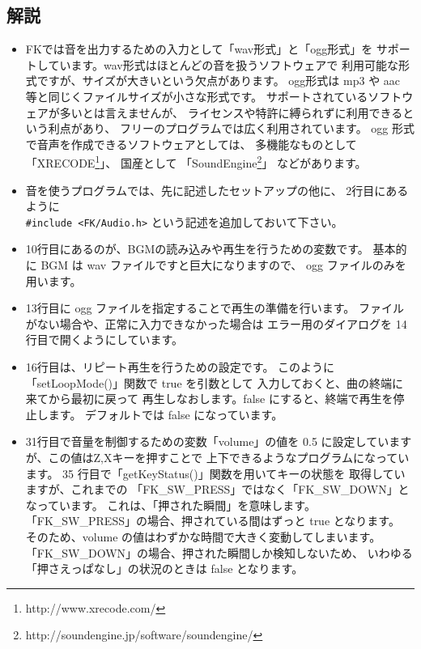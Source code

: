 \subsection*{解説}
\begin{itemize}
 \item FKでは音を出力するための入力として「wav形式」と「ogg形式」を
	サポートしています。wav形式はほとんどの音を扱うソフトウェアで
	利用可能な形式ですが、サイズが大きいという欠点があります。
	ogg形式は mp3 や aac 等と同じくファイルサイズが小さな形式です。
	サポートされているソフトウェアが多いとは言えませんが、
	ライセンスや特許に縛られずに利用できるという利点があり、
	フリーのプログラムでは広く利用されています。
	ogg 形式で音声を作成できるソフトウェアとしては、
	多機能なものとして
	「XRECODE\footnote{http://www.xrecode.com/}」、
	国産として
	「SoundEngine\footnote{
	http://soundengine.jp/software/soundengine/}」
	などがあります。

 \item 音を使うプログラムでは、先に記述したセットアップの他に、
	2行目にあるように\\
	\verb+#include <FK/Audio.h>+
	という記述を追加しておいて下さい。

 \item 10行目にあるのが、BGMの読み込みや再生を行うための変数です。
	基本的に BGM は wav ファイルですと巨大になりますので、
	ogg ファイルのみを用います。

 \item 13行目に ogg ファイルを指定することで再生の準備を行います。
	ファイルがない場合や、正常に入力できなかった場合は
	エラー用のダイアログを 14 行目で開くようにしています。

 \item 16行目は、リピート再生を行うための設定です。
	このように「setLoopMode()」関数で true を引数として
	入力しておくと、曲の終端に来てから最初に戻って
	再生しなおします。false にすると、終端で再生を停止します。
	デフォルトでは false になっています。

 \item 31行目で音量を制御するための変数「volume」の値を
	0.5 に設定していますが、この値はZ,Xキーを押すことで
	上下できるようなプログラムになっています。
	35 行目で「getKeyStatus()」関数を用いてキーの状態を
	取得していますが、これまでの
	「FK\_SW\_PRESS」ではなく「FK\_SW\_DOWN」となっています。
	これは、「押された瞬間」を意味します。
	「FK\_SW\_PRESS」の場合、押されている間はずっと true となります。
	そのため、volume の値はわずかな時間で大きく変動してしまいます。
	「FK\_SW\_DOWN」の場合、押された瞬間しか検知しないため、
	いわゆる「押さえっぱなし」の状況のときは false となります。


\end{itemize}
